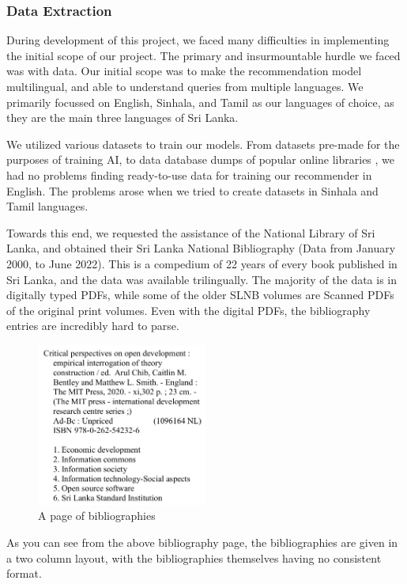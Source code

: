 \subsubsection{Data Extraction}
During development of this project, we faced many difficulties in implementing the initial scope of our project. The primary and insurmountable hurdle we faced was with data. Our initial scope was to make the recommendation model multilingual, and able to understand queries from multiple languages. We primarily focussed on English, Sinhala, and Tamil as our languages of choice, as they are the main three languages of Sri Lanka.

We utilized various datasets to train our models. From datasets pre-made for the purposes of training AI, to data database dumps of popular online libraries \cite{goodbooks-10k-extended}, we had no problems finding ready-to-use data for training our recommender in English. The problems arose when we tried to create datasets in Sinhala and Tamil languages.

Towards this end, we requested the assistance of the National Library of Sri Lanka, and obtained their Sri Lanka National Bibliography \cite{sri_lanka_national_bibliography} (Data from January 2000, to June 2022). This is a compedium of 22 years of every book published in Sri Lanka, and the data was available trilingually. The majority of the data is in digitally typed PDFs, while some of the older SLNB volumes are Scanned PDFs of the original print volumes. Even with the digital PDFs, the bibliography entries are incredibly hard to parse.

\begin{figure}[htbp]
    \centering
    \includegraphics[width=0.5\textwidth]{../../assets/snlb_entry.png}
    \caption{A page of bibliographies}
    \label{fig:slnbpage}
\end{figure}

As you can see from the above bibliography page, the bibliographies are given in a two column layout, with the bibliographies themselves having no consistent format.

